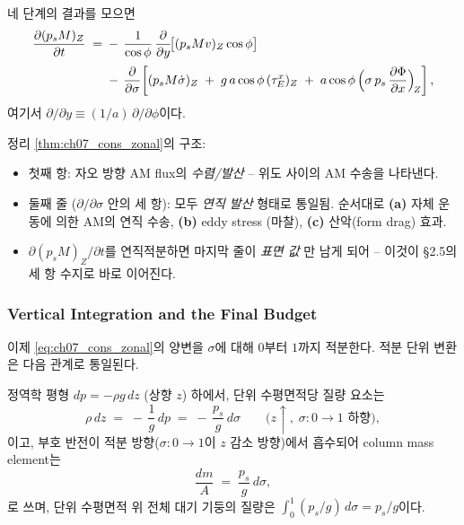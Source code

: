 \begin{theorem}\label{thm:ch07_cons_zonal}
네 단계의 결과를 모으면
\begin{equation}\label{eq:ch07_cons_zonal}
  \begin{aligned}
    \frac{\partial(p_s M)_Z}{\partial t}
    \;=\;&
    -\,\frac{1}{\cos\phi}\,\frac{\partial}{\partial y}\!
       \bigl[(p_s M v)_Z\cos\phi\bigr]
    \\[2pt]
    & -\, \frac{\partial}{\partial\sigma}\!\left[
         (p_s M\dot\sigma)_Z
         \;+\; g\,a\cos\phi\,(\tau_E^x)_Z
         \;+\; a\cos\phi\,\Bigl(\sigma\,p_s\,\frac{\partial\Phi}{\partial x}\Bigr)_{\!Z}
       \right],
  \end{aligned}
\end{equation}
여기서 $\partial/\partial y \equiv (1/a)\,\partial/\partial\phi$이다.
\end{theorem}


\begin{hisublock}
정리 \ref{thm:ch07_cons_zonal}의 구조:
\begin{itemize}
  \item 첫째 항: 자오 방향 AM flux의 \emph{수렴/발산} -- 위도 사이의 AM
        수송을 나타낸다.
  \item 둘째 줄 ($\partial/\partial\sigma$ 안의 세 항): 모두 \emph{연직 발산}
        형태로 통일됨.  순서대로 \textbf{(a)} 자체 운동에 의한 AM의 연직 수송,
        \textbf{(b)} eddy stress (마찰), \textbf{(c)} 산악(form drag) 효과.
  \item $\partial(p_s M)_Z/\partial t$를 연직적분하면 마지막 줄이 \emph{표면 값}
        만 남게 되어 -- 이것이 \S2.5의 세 항 수지로 바로 이어진다.
\end{itemize}
\end{hisublock}

\subsubsection{Vertical Integration and the Final Budget}

이제 \eqref{eq:ch07_cons_zonal}의 양변을 $\sigma$에 대해 $0$부터 $1$까지
적분한다.  적분 단위 변환은 다음 관계로 통일된다.

\begin{definition}\label{def:ch07_cons_mass}
정역학 평형 $dp = -\rho g\,dz$ (상향 $z$) 하에서, 단위 수평면적당
질량 요소는
\begin{equation}\label{eq:ch07_cons_mass}
  \rho\,dz \;=\; -\,\frac{1}{g}\,dp \;=\; -\,\frac{p_s}{g}\,d\sigma
  \qquad\bigl(z\uparrow,\;\sigma:0\to 1\text{ 하향}\bigr),
\end{equation}
이고, 부호 반전이 적분 방향($\sigma: 0\to 1$이 $z$ 감소 방향)에서 흡수되어
column mass element는
\[
  \frac{dm}{A} \;=\; \frac{p_s}{g}\,d\sigma,
\]
로 쓰며, 단위 수평면적 위 전체 대기 기둥의 질량은 $\int_0^1 (p_s/g)\,d\sigma
= p_s/g$이다.
\end{definition}

